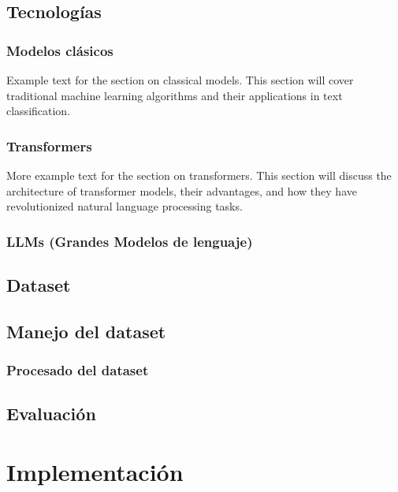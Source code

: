 \documentclass[11pt,spanish,listoffigures,listoftables]{tfgetsinf}
\begin{document}
\section{Tecnologías}

\subsection{Modelos clásicos}
Example text for the section on classical models. This section will cover traditional machine learning algorithms and their applications in text classification.

\subsection{Transformers}
More example text for the section on transformers. This section will discuss the architecture of transformer models, their advantages, and how they have revolutionized natural language processing tasks.

\subsection{LLMs (Grandes Modelos de lenguaje)}

\section{Dataset}


\section{Manejo del dataset}

\subsection{Procesado del dataset}

\section{Evaluación}

\chapter{Implementación}
\end{document}
